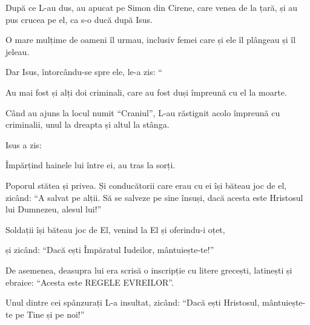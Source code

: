 {\par }{\PP {}După ce L-au dus, au apucat pe Simon din Cirene, care venea de la țară, și au pus crucea pe el, ca s-o ducă după Isus.

O mare mulțime de oameni îl urmau, inclusiv femei care și ele îl plângeau și îl jeleau.

Dar Isus, întorcându-se spre ele, le-a zis: “{}





\par }{\PP {}Au mai fost și alți doi criminali, care au fost duși împreună cu el la moarte.

Când au ajuns la locul numit “Craniul”, L-au răstignit acolo împreună cu criminalii, unul la dreapta și altul la stânga.


\par }{\PP {}Isus a zis:
{}

\par }{\PP Împărțind hainele lui între ei, au tras la sorți.

Poporul stătea și privea. Și conducătorii care erau cu ei își băteau joc de el, zicând: “A salvat pe alții. Să se salveze pe sine însuși, dacă acesta este Hristosul lui Dumnezeu, alesul lui!”


\par }{\PP {}Soldații își băteau joc de El, venind la El și oferindu-i oțet,

și zicând: “Dacă ești Împăratul Iudeilor, mântuiește-te!”


\par }{\PP {}De asemenea, deasupra lui era scrisă o inscripție cu litere grecești, latinești și ebraice: “Acesta este REGELE EVREILOR”.


\par }{\PP {}Unul dintre cei spânzurați L-a insultat, zicând: “Dacă ești Hristosul, mântuiește-te pe Tine și pe noi!”


}
